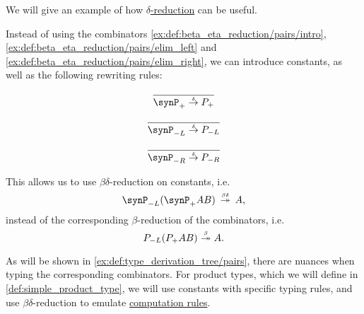 \begin{remark}\label{rem:delta_reduction}
  We will give an example of how \hyperref[def:delta_reduction]{\( \delta \)-reduction} can be useful.

  Instead of using the combinators \ref{ex:def:beta_eta_reduction/pairs/intro}, \ref{ex:def:beta_eta_reduction/pairs/elim_left} and \ref{ex:def:beta_eta_reduction/pairs/elim_right}, we can introduce constants, as well as the following rewriting rules:
  \begin{paracol}{3}
    \begin{nthcolumn}{0}
      \ParacolAlignmentHack
      \begin{equation*}
        \begin{prooftree}
          \infer0{ \synP_+ \dred P_+ }
        \end{prooftree}
      \end{equation*}
    \end{nthcolumn}

    \begin{nthcolumn}{1}
      \ParacolAlignmentHack
      \begin{equation*}
        \begin{prooftree}
          \infer0{ \synP_{-L} \dred P_{-L} }
        \end{prooftree}
      \end{equation*}
    \end{nthcolumn}

    \begin{nthcolumn}{2}
      \ParacolAlignmentHack
      \begin{equation*}
        \begin{prooftree}
          \infer0{ \synP_{-R} \dred P_{-R} }
        \end{prooftree}
      \end{equation*}
    \end{nthcolumn}
  \end{paracol}

  This allows us to use \( \beta\delta \)-reduction on constants, i.e.
  \begin{equation*}
    \synP_{-L} (\synP_+ A B) \redrel*{\beta\delta} A,
  \end{equation*}
  instead of the corresponding \( \beta \)-reduction of the combinators, i.e.
  \begin{equation*}
    P_{-L} (P_+ A B) \bred* A.
  \end{equation*}

  As will be shown in \cref{ex:def:type_derivation_tree/pairs}, there are nuances when typing the corresponding combinators. For product types, which we will define in \cref{def:simple_product_type}, we will use constants with specific typing rules, and use \( \beta\delta \)-reduction to emulate \hyperref[rem:type_theory_rule_classification/equality/comp]{computation rules}.
\end{remark}

